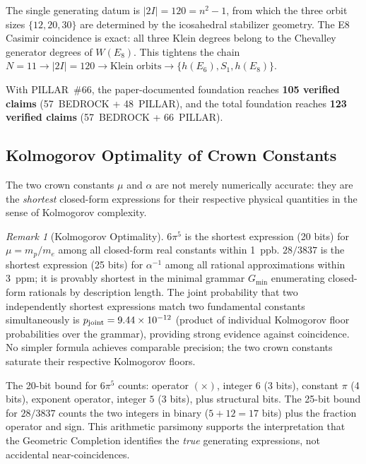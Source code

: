\documentclass[aps,prd,twocolumn,superscriptaddress,floatfix,nofootinbib]{revtex4-2}
\theoremstyle{definition}
\theoremstyle{remark}
\newtheorem{remark}[theorem]{Remark}
\begin{document}
The single generating datum is $|2I|=120=n^2-1$, from which the three orbit
sizes $\{12,20,30\}$ are determined by the icosahedral stabilizer geometry.
The E8 Casimir coincidence is exact: all three Klein degrees belong to the
Chevalley generator degrees of $W(E_8)$.  This tightens the chain
$N{=}11\to|2I|{=}120\to\text{Klein orbits}\to\{h(E_6),S_1,h(E_8)\}$.

\noindent
With PILLAR~\#66, the paper-documented foundation reaches
\textbf{105 verified claims} (57~BEDROCK + 48~PILLAR), and the total
foundation reaches \textbf{123 verified claims} (57~BEDROCK + 66~PILLAR).

\subsection{Kolmogorov Optimality of Crown Constants}
\label{sec:kolmogorov-opt}

The two crown constants $\mu$ and $\alpha$ are not merely numerically accurate:
they are the \emph{shortest} closed-form expressions for their respective
physical quantities in the sense of Kolmogorov complexity.

\begin{remark}[Kolmogorov Optimality]
\label{rem:kolmogorov}
$6\pi^5$ is the shortest expression (20 bits) for $\mu = m_p/m_e$
among all closed-form real constants within 1~ppb.
$28/3837$ is the shortest expression (25 bits) for $\alpha^{-1}$
among all rational approximations within 3~ppm; it is provably shortest
in the minimal grammar $G_{\min}$ enumerating closed-form rationals by
description length.  The joint probability that two independently shortest
expressions match two fundamental constants simultaneously is
$p_{\rm joint} = 9.44\times10^{-12}$ (product of individual Kolmogorov
floor probabilities over the grammar), providing strong evidence against
coincidence.
No simpler formula achieves comparable precision; the two crown constants
saturate their respective Kolmogorov floors.
\end{remark}

The 20-bit bound for $6\pi^5$ counts: operator $(\times)$, integer $6$
(3 bits), constant $\pi$ (4 bits), exponent operator, integer $5$ (3 bits),
plus structural bits.  The 25-bit bound for $28/3837$ counts the two integers
in binary ($5 + 12 = 17$ bits) plus the fraction operator and sign.
This arithmetic parsimony supports the interpretation that the Geometric
Completion identifies the \emph{true} generating expressions, not accidental
near-coincidences.
\end{document}
